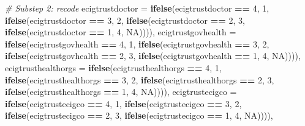 \documentclass[
]{article}
\newenvironment{Shaded}{\begin{snugshade}}{\end{snugshade}}
\newcommand{\AttributeTok}[1]{\textcolor[rgb]{0.13,0.29,0.53}{#1}}
\newcommand{\CommentTok}[1]{\textcolor[rgb]{0.56,0.35,0.01}{\textit{#1}}}
\newcommand{\ConstantTok}[1]{\textcolor[rgb]{0.56,0.35,0.01}{#1}}
\newcommand{\DecValTok}[1]{\textcolor[rgb]{0.00,0.00,0.81}{#1}}
\newcommand{\FunctionTok}[1]{\textcolor[rgb]{0.13,0.29,0.53}{\textbf{#1}}}
\newcommand{\NormalTok}[1]{#1}
\newcommand{\SpecialCharTok}[1]{\textcolor[rgb]{0.81,0.36,0.00}{\textbf{#1}}}
\begin{document}
\begin{Shaded}
\begin{Highlighting}[]
    \CommentTok{\# Substep 2: recode}
    \AttributeTok{ecigtrustdoctor =} \FunctionTok{ifelse}\NormalTok{(ecigtrustdoctor }\SpecialCharTok{==} \DecValTok{4}\NormalTok{, }\DecValTok{1}\NormalTok{,}
                              \FunctionTok{ifelse}\NormalTok{(ecigtrustdoctor }\SpecialCharTok{==} \DecValTok{3}\NormalTok{, }\DecValTok{2}\NormalTok{,}
                                     \FunctionTok{ifelse}\NormalTok{(ecigtrustdoctor }\SpecialCharTok{==} \DecValTok{2}\NormalTok{, }\DecValTok{3}\NormalTok{,}
                                            \FunctionTok{ifelse}\NormalTok{(ecigtrustdoctor }\SpecialCharTok{==} \DecValTok{1}\NormalTok{, }\DecValTok{4}\NormalTok{, }\ConstantTok{NA}\NormalTok{)))),}
    \AttributeTok{ecigtrustgovhealth =} \FunctionTok{ifelse}\NormalTok{(ecigtrustgovhealth }\SpecialCharTok{==} \DecValTok{4}\NormalTok{, }\DecValTok{1}\NormalTok{,}
                                 \FunctionTok{ifelse}\NormalTok{(ecigtrustgovhealth }\SpecialCharTok{==} \DecValTok{3}\NormalTok{, }\DecValTok{2}\NormalTok{,}
                                        \FunctionTok{ifelse}\NormalTok{(ecigtrustgovhealth }\SpecialCharTok{==} \DecValTok{2}\NormalTok{, }\DecValTok{3}\NormalTok{,}
                                               \FunctionTok{ifelse}\NormalTok{(ecigtrustgovhealth }\SpecialCharTok{==} \DecValTok{1}\NormalTok{, }\DecValTok{4}\NormalTok{, }\ConstantTok{NA}\NormalTok{)))),}
    \AttributeTok{ecigtrusthealthorgs =} \FunctionTok{ifelse}\NormalTok{(ecigtrusthealthorgs }\SpecialCharTok{==} \DecValTok{4}\NormalTok{, }\DecValTok{1}\NormalTok{,}
                                 \FunctionTok{ifelse}\NormalTok{(ecigtrusthealthorgs }\SpecialCharTok{==} \DecValTok{3}\NormalTok{, }\DecValTok{2}\NormalTok{,}
                                        \FunctionTok{ifelse}\NormalTok{(ecigtrusthealthorgs }\SpecialCharTok{==} \DecValTok{2}\NormalTok{, }\DecValTok{3}\NormalTok{,}
                                               \FunctionTok{ifelse}\NormalTok{(ecigtrusthealthorgs }\SpecialCharTok{==} \DecValTok{1}\NormalTok{, }\DecValTok{4}\NormalTok{, }\ConstantTok{NA}\NormalTok{)))),}
    \AttributeTok{ecigtrustecigco =} \FunctionTok{ifelse}\NormalTok{(ecigtrustecigco }\SpecialCharTok{==} \DecValTok{4}\NormalTok{, }\DecValTok{1}\NormalTok{,}
                                \FunctionTok{ifelse}\NormalTok{(ecigtrustecigco }\SpecialCharTok{==} \DecValTok{3}\NormalTok{, }\DecValTok{2}\NormalTok{,}
                                       \FunctionTok{ifelse}\NormalTok{(ecigtrustecigco }\SpecialCharTok{==} \DecValTok{2}\NormalTok{, }\DecValTok{3}\NormalTok{,}
                                              \FunctionTok{ifelse}\NormalTok{(ecigtrustecigco }\SpecialCharTok{==} \DecValTok{1}\NormalTok{, }\DecValTok{4}\NormalTok{, }\ConstantTok{NA}\NormalTok{)))),}
  

\end{Highlighting}
\end{Shaded}
\end{document}
